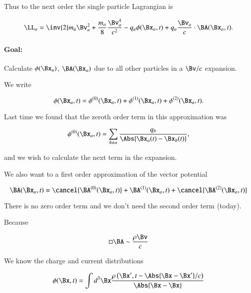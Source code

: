 Thus to the next order the single particle Lagrangian is

\begin{equation}\label{eqn:relativisticElectrodynamicsL25:110}
\LL_a = \inv{2} m_a \Bv_a^2 + \frac{m_a}{8} \frac{\Bv_a^4}{c^2} - q_a \phi(\Bx_a, t) + q_a \frac{\Bv_a}{c} \cdot \BA(\Bx_a, t).
\end{equation}

\paragraph{Goal:} Calculate $\phi(\Bx_a)$, $\BA(\Bx_a)$ due to all other particles in a $\Bv/c$ expansion.

We write

\begin{equation}\label{eqn:relativisticElectrodynamicsL25:130}
\phi(\Bx_a, t) = 
\phi^{(0)}(\Bx_a, t)
+\phi^{(1)}(\Bx_a, t)
+\phi^{(2)}(\Bx_a, t).
\end{equation}

Last time we found that the zeroth order term in this approximation was

\begin{equation}\label{eqn:relativisticElectrodynamicsL25:150}
\phi^{(0)}(\Bx_a, t) = \sum_{b \ne a} \frac{q_b}{\Abs{\Bx_a(t) - \Bx_b(t)}},
\end{equation}

and we wish to calculate the next term in the expansion.

We also want to a first order approximation of the vector potential

\begin{equation}\label{eqn:relativisticElectrodynamicsL25:170}
\BA(\Bx_a, t) = 
\cancel{\BA^{(0)}(\Bx_a, t)}
+\BA^{(1)}(\Bx_a, t)
+\cancel{\BA^{(2)}(\Bx_a, t)}
\end{equation}

There is no zero order term and we don't need the second order term (today).

Because

\begin{equation}\label{eqn:relativisticElectrodynamicsL25:190}
\square \BA \sim \frac{\rho \Bv}{c}
\end{equation}

We know the charge and current distributions

\begin{equation}\label{eqn:relativisticElectrodynamicsL25:210}
\phi(\Bx, t) = \int d^3 \Bx \frac{\rho\left(\Bx', t - \Abs{\Bx - \Bx'}/c\right)}{\Abs{\Bx - \Bx}}
\end{equation}

